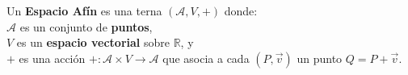 \documentclass[preview]{standalone}
\begin{document}
\begin{center}
Un \textbf{Espacio Afín} es una terna $(\mathcal{A}, V, +)$ donde:\\$\mathcal{A}$ es un conjunto de \textbf{puntos},\\$V$ es un \textbf{espacio vectorial} sobre $\mathbb{R}$, y\\$+$ es una acción $+: \mathcal{A} \times V \to \mathcal{A}$ que asocia a cada $(P, \vec{v})$ un punto $Q = P + \vec{v}$.
\end{center}
\end{document}
